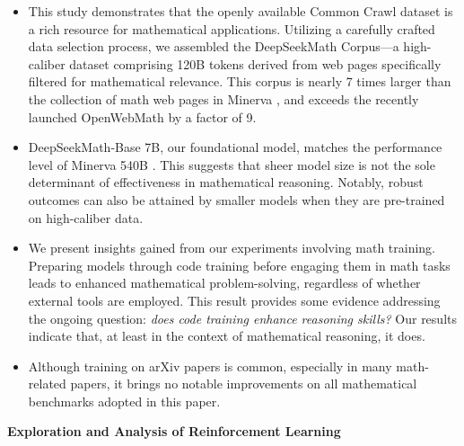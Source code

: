 \begin{itemize}[topsep=0pt]
    \item This study demonstrates that the openly available Common Crawl dataset is a rich resource for mathematical applications. Utilizing a carefully crafted data selection process, we assembled the DeepSeekMath Corpus—a high-caliber dataset comprising 120B tokens derived from web pages specifically filtered for mathematical relevance. This corpus is nearly 7 times larger than the collection of math web pages in Minerva \citep{minerva}, and exceeds the recently launched OpenWebMath \citep{openwebmath} by a factor of 9.

\item DeepSeekMath-Base 7B, our foundational model, matches the performance level of Minerva 540B \citep{minerva}. This suggests that sheer model size is not the sole determinant of effectiveness in mathematical reasoning. Notably, robust outcomes can also be attained by smaller models when they are pre-trained on high-caliber data.

\item We present insights gained from our experiments involving math training. Preparing models through code training before engaging them in math tasks leads to enhanced mathematical problem-solving, regardless of whether external tools are employed. This result provides some evidence addressing the ongoing question: \textit{does code training enhance reasoning skills?} Our results indicate that, at least in the context of mathematical reasoning, it does.

    \item Although training on arXiv papers is common, especially in many math-related papers, it brings no notable improvements on all mathematical benchmarks adopted in this paper.
\end{itemize}

\textbf{Exploration and Analysis of Reinforcement Learning}

